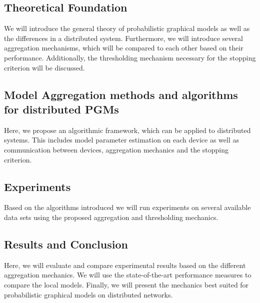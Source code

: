   \subsection{Theoretical Foundation}
    We will introduce the general theory of probabilistic graphical models as well as the differences in a distributed system. 
    Furthermore, we will introduce several aggregation mechanisms, which will be compared to each other based on their performance.
    Additionally, the thresholding mechanism necessary for the  stopping criterion will be discussed. 

  \subsection{Model Aggregation methods and algorithms for distributed PGMs}
    Here, we propose an algorithmic framework, which can be applied to distributed systems.
    This includes model parameter estimation on each device as well as communication between devices, aggregation mechanics and the stopping criterion.

  \subsection{Experiments}
  Based on the algorithms introduced we will run experiments on several available data sets using the proposed aggregation and thresholding mechanics.

  \subsection{Results and Conclusion}
  Here, we will evaluate and compare experimental results based on the different aggregation mechanics. 
  We will use the state-of-the-art performance measures to compare the local models.
  Finally, we will present the mechanics best suited for probabilistic graphical models on distributed networks.

